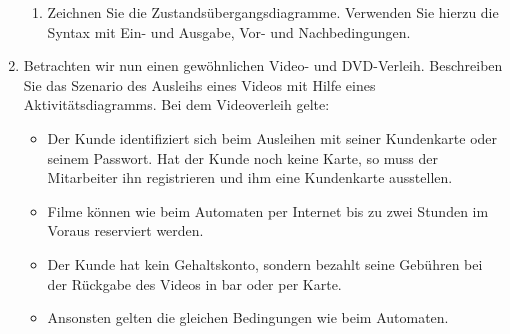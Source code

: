 \documentclass{lehramt-informatik-aufgabe}
\begin{document}
\begin{enumerate}
\begin{enumerate}
\item Zeichnen Sie die Zustandsübergangsdiagramme. Verwenden Sie hierzu
die Syntax mit Ein- und Ausgabe, Vor- und Nachbedingungen.
\end{enumerate}

\item Betrachten wir nun einen gewöhnlichen Video- und DVD-Verleih.
Beschreiben Sie das Szenario des Ausleihs eines Videos mit Hilfe eines
Aktivitätsdiagramms. Bei dem Videoverleih gelte:

\begin{itemize}
\item Der Kunde identifiziert sich beim Ausleihen mit seiner Kundenkarte
oder seinem Passwort. Hat der Kunde noch keine Karte, so muss der
Mitarbeiter ihn registrieren und ihm eine Kundenkarte ausstellen.

\item Filme können wie beim Automaten per Internet bis zu zwei Stunden
im Voraus reserviert werden.

\item Der Kunde hat kein Gehaltskonto, sondern bezahlt seine Gebühren
bei der Rückgabe des Videos in bar oder per Karte.

\item Ansonsten gelten die gleichen Bedingungen wie beim Automaten.
\end{itemize}
\end{enumerate}
\end{document}
